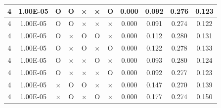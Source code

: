 \documentclass[11pt]{article}
\begin{document}
\begin{longtable}[h]{|r|r|l|l|l|l|l|r|r|l|r|}
\multicolumn{1}{|c|}{4} & \multicolumn{1}{c|}{1.00E-05} & \multicolumn{1}{c|}{O} & \multicolumn{1}{c|}{O} & \multicolumn{1}{c|}{×} & \multicolumn{1}{c|}{×} & \multicolumn{1}{c|}{O} & \multicolumn{1}{c|}{0.000} & \multicolumn{1}{c|}{0.092} & \multicolumn{1}{c|}{0.276} & \multicolumn{1}{c|}{0.123} \\ \hline
\multicolumn{1}{|c|}{4} & \multicolumn{1}{c|}{1.00E-05} & \multicolumn{1}{c|}{O} & \multicolumn{1}{c|}{O} & \multicolumn{1}{c|}{×} & \multicolumn{1}{c|}{×} & \multicolumn{1}{c|}{×} & \multicolumn{1}{c|}{0.000} & \multicolumn{1}{c|}{0.091} & \multicolumn{1}{c|}{0.274} & \multicolumn{1}{c|}{0.122} \\ \hline
\multicolumn{1}{|c|}{4} & \multicolumn{1}{c|}{1.00E-05} & \multicolumn{1}{c|}{O} & \multicolumn{1}{c|}{×} & \multicolumn{1}{c|}{O} & \multicolumn{1}{c|}{O} & \multicolumn{1}{c|}{×} & \multicolumn{1}{c|}{0.000} & \multicolumn{1}{c|}{0.112} & \multicolumn{1}{c|}{0.280} & \multicolumn{1}{c|}{0.131} \\ \hline
\multicolumn{1}{|c|}{4} & \multicolumn{1}{c|}{1.00E-05} & \multicolumn{1}{c|}{O} & \multicolumn{1}{c|}{×} & \multicolumn{1}{c|}{O} & \multicolumn{1}{c|}{×} & \multicolumn{1}{c|}{O} & \multicolumn{1}{c|}{0.000} & \multicolumn{1}{c|}{0.122} & \multicolumn{1}{c|}{0.278} & \multicolumn{1}{c|}{0.133} \\ \hline
\multicolumn{1}{|c|}{4} & \multicolumn{1}{c|}{1.00E-05} & \multicolumn{1}{c|}{O} & \multicolumn{1}{c|}{×} & \multicolumn{1}{c|}{×} & \multicolumn{1}{c|}{O} & \multicolumn{1}{c|}{×} & \multicolumn{1}{c|}{0.000} & \multicolumn{1}{c|}{0.093} & \multicolumn{1}{c|}{0.280} & \multicolumn{1}{c|}{0.124} \\ \hline
\multicolumn{1}{|c|}{4} & \multicolumn{1}{c|}{1.00E-05} & \multicolumn{1}{c|}{O} & \multicolumn{1}{c|}{×} & \multicolumn{1}{c|}{×} & \multicolumn{1}{c|}{×} & \multicolumn{1}{c|}{O} & \multicolumn{1}{c|}{0.000} & \multicolumn{1}{c|}{0.092} & \multicolumn{1}{c|}{0.277} & \multicolumn{1}{c|}{0.123} \\ \hline
\multicolumn{1}{|c|}{4} & \multicolumn{1}{c|}{1.00E-05} & \multicolumn{1}{c|}{×} & \multicolumn{1}{c|}{O} & \multicolumn{1}{c|}{O} & \multicolumn{1}{c|}{×} & \multicolumn{1}{c|}{×} & \multicolumn{1}{c|}{0.000} & \multicolumn{1}{c|}{0.147} & \multicolumn{1}{c|}{0.270} & \multicolumn{1}{c|}{0.139} \\ \hline
\multicolumn{1}{|c|}{4} & \multicolumn{1}{c|}{1.00E-05} & \multicolumn{1}{c|}{×} & \multicolumn{1}{c|}{O} & \multicolumn{1}{c|}{×} & \multicolumn{1}{c|}{O} & \multicolumn{1}{c|}{×} & \multicolumn{1}{c|}{0.000} & \multicolumn{1}{c|}{0.177} & \multicolumn{1}{c|}{0.274} & \multicolumn{1}{c|}{0.150} \\ \hline

\end{longtable}
\end{document}
